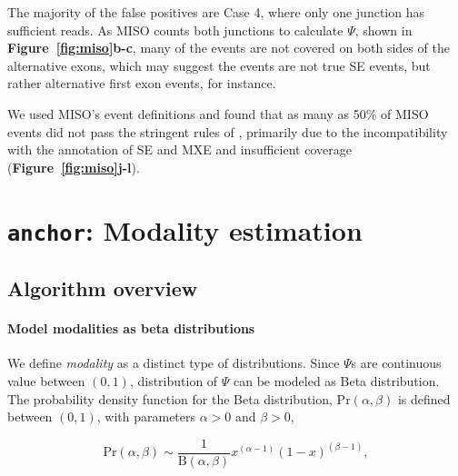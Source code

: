 \clearpage


The majority of the false positives are Case 4, where only one junction has sufficient reads. As MISO counts both junctions to calculate $\Psi$, shown in \textbf{Figure~\ref{fig:miso}b-c}, many of the events are not covered on both sides of the alternative exons, which may suggest the events are not true SE events, but rather alternative first exon events, for instance.

We used MISO's event definitions and found that as many as 50\% of MISO events did not pass the stringent rules of \outrigger, primarily due to the incompatibility with the annotation of SE and MXE and insufficient coverage (\textbf{Figure~\ref{fig:miso}j-l}).


\section{\texttt{anchor}: Modality estimation}
\label{sec:anchor}

\subsection{Algorithm overview}
\paragraph{Model modalities as beta distributions}

We define \emph{modality} as a distinct type of distributions. Since $\Psi$s are continuous value between $(0, 1)$, distribution of $\Psi$ can be modeled as Beta distribution. The probability density function for the Beta distribution, $\mathrm{Pr}(\alpha, \beta)$ is defined between $(0, 1)$, with parameters $\alpha > 0$ and $\beta > 0$,

\begin{equation}
\mathrm{Pr}(\alpha, \beta) \sim \frac{1}{\mathrm{B}\left(\alpha, \beta\right)}  x^{(\alpha - 1)} \left(1-x\right)^{(\beta-1)},
\end{equation}

